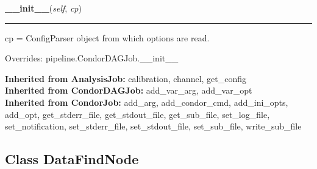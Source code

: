     \label{inspiral:DataFindJob:__init__}
    \vspace{0.5ex}

    \noindent\begin{boxedminipage}{\textwidth}

    \raggedright \textbf{\_\_init\_\_}(\textit{self}, \textit{cp})

    \vspace{-1.5ex}

    \rule{\textwidth}{0.5\fboxrule}
    cp = ConfigParser object from which options are read.

    \vspace{1ex}

      Overrides: pipeline.CondorDAGJob.\_\_init\_\_

    \end{boxedminipage}

  \noindent\textbf{Inherited from AnalysisJob:}
    calibration,
    channel,
    get\_config
    \\
  \noindent\textbf{Inherited from CondorDAGJob:}
    add\_var\_arg,
    add\_var\_opt
    \\
  \noindent\textbf{Inherited from CondorJob:}
    add\_arg,
    add\_condor\_cmd,
    add\_ini\_opts,
    add\_opt,
    get\_stderr\_file,
    get\_stdout\_file,
    get\_sub\_file,
    set\_log\_file,
    set\_notification,
    set\_stderr\_file,
    set\_stdout\_file,
    set\_sub\_file,
    write\_sub\_file


\subsection{Class DataFindNode}

